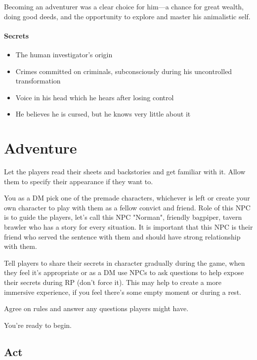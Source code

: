 \documentclass[10pt,onecolumn,twoside,openany,bg=full,layout=true]{dndbook}
\begin{document}
Becoming an adventurer was a clear choice for him—a chance for great wealth, doing good deeds, and the opportunity to
explore and master his animalistic self.

\subsubsection{Secrets}
\begin{itemize}
  \item The human investigator's origin
  \item Crimes committed on criminals, subconsciously during his uncontrolled transformation
  \item Voice in his head which he hears after losing control
  \item He believes he is cursed, but he knows very little about it
\end{itemize}

\vfill

\chapter{Adventure}\label{ch:adventure}
Let the players read their sheets and backstories and get familiar with it.
Allow them to specify their appearance if they want to.

You as a DM pick one of the premade characters, whichever is left or create your own character to play with them as a fellow convict and
friend.
Role of this NPC is to guide the players, let's call this NPC "Norman", friendly bagpiper, tavern brawler who has a story for every situation.
It is important that this NPC is their friend who served the sentence with them and should have strong relationship with them.

Tell players to share their secrets in character gradually during the game, when they feel it's appropriate or as a DM use
NPCs to ask questions to help expose their secrets during RP (don't force it).
This may help to create a more immersive experience, if you feel there's some empty moment or during a rest.

Agree on rules and answer any questions players might have.

You're ready to begin.

\setcounter{act_num}{1}

\section{Act }\label{sec:act-roman{act_num}}
\addtocounter{act_num}{1}
\end{document}
